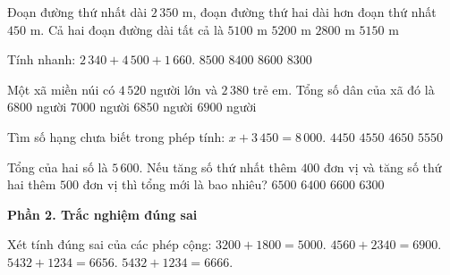\begin{ex} %
Đoạn đường thứ nhất dài $2\,350\text{ m}$, đoạn đường thứ hai dài hơn đoạn thứ nhất $450\text{ m}$. Cả hai đoạn đường dài tất cả là
\choice
{$5100\text{ m}$}
{$5200\text{ m}$}
{$2800\text{ m}$}
{\True $5150\text{ m}$}
\end{ex}

\begin{ex} %
Tính nhanh: $2\,340 + 4\,500 + 1\,660$.
\choice
{\True $8500$}
{$8400$}
{$8600$}
{$8300$}
\end{ex}

\begin{ex} %
Một xã miền núi có $4\,520$ người lớn và $2\,380$ trẻ em. Tổng số dân của xã đó là
\choice
{$6800$ người}
{$7000$ người}
{$6850$ người}
{\True $6900$ người}
\end{ex}

\begin{ex} %
Tìm số hạng chưa biết trong phép tính: $x + 3\,450 = 8\,000$.
\choice
{$4450$}
{\True $4550$}
{$4650$}
{$5550$}
\end{ex}

\begin{ex} %
Tổng của hai số là $5\,600$. Nếu tăng số thứ nhất thêm $400$ đơn vị và tăng số thứ hai thêm $500$ đơn vị thì tổng mới là bao nhiêu?
\choice
{\True $6500$}
{$6400$}
{$6600$}
{$6300$}
\end{ex}

\textbf{Phần 2. Trắc nghiệm đúng sai}

\begin{ex} %
Xét tính đúng sai của các phép cộng:
\choiceTF
{\True $3200 + 1800 = 5000$.}
{\True $4560 + 2340 = 6900$.}
{$5432 + 1234 = 6656$.}
{\True $5432 + 1234 = 6666$.}
\end{ex}

